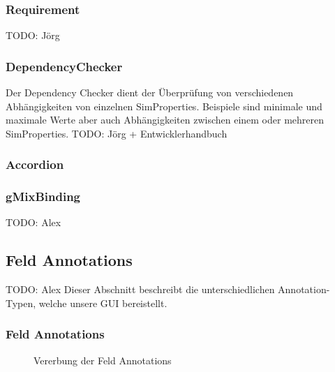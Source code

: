 \documentclass[a4paper, 11pt]{article} %
\begin{document}
\subsubsection{Requirement} %
\label{ssub:requirement}
TODO: Jörg

\subsubsection{DependencyChecker}
\label{sssub:dependencychecker}
Der Dependency Checker dient der Überprüfung von verschiedenen Abhängigkeiten von einzelnen SimProperties. Beispiele sind minimale und maximale Werte aber auch Abhängigkeiten zwischen einem oder mehreren SimProperties.
TODO: Jörg + Entwicklerhandbuch


\subsubsection{Accordion} %
\label{ssub:accordion}


\subsubsection{gMixBinding} %
\label{ssub:gmixbinding}

TODO: Alex

\subsection{Feld Annotations} %
TODO: Alex
\label{sub:annotations}
Dieser Abschnitt beschreibt die unterschiedlichen Annotation-Typen, welche unsere GUI bereistellt.

\subsubsection{Feld Annotations} %
\label{ssub:feld_annotations}

\begin{figure}[!htp]
\caption{Vererbung der Feld Annotations}
\label{fig:field_annotations}
\end{figure}
\end{document}
